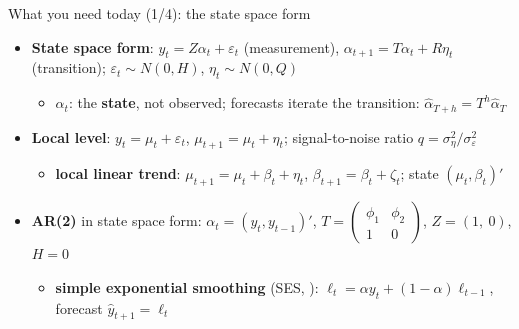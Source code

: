 \begin{frame}{What you need today (1/4): the state space form}
\itemsize{\small}
\begin{itemize}
    \item \textbf{State space form}: $y_t = Z\alpha_t + \varepsilon_t$ (measurement), $\alpha_{t+1} = T\alpha_t + R\eta_t$ (transition); $\varepsilon_t \sim N(0, H)$, $\eta_t \sim N(0, Q)$
    \begin{itemize}
        \item $\alpha_t$: the \textbf{state}, not observed; forecasts iterate the transition: $\hat\alpha_{T+h} = T^h\hat\alpha_T$
    \end{itemize}
    \item \textbf{Local level}: $y_t = \mu_t + \varepsilon_t$, $\mu_{t+1} = \mu_t + \eta_t$; signal-to-noise ratio $q = \sigma^2_\eta/\sigma^2_\varepsilon$
    \begin{itemize}
        \item \textbf{local linear trend}: $\mu_{t+1} = \mu_t + \beta_t + \eta_t$, $\beta_{t+1} = \beta_t + \zeta_t$; state $(\mu_t, \beta_t)'$
    \end{itemize}
    \item \textbf{AR(2)} in state space form: $\alpha_t = (y_t, y_{t-1})'$, $T = \begin{pmatrix}\phi_1 & \phi_2\\ 1 & 0\end{pmatrix}$, $Z = (1,\ 0)$, $H = 0$
    \begin{itemize}
        \item \textbf{simple exponential smoothing} (SES, ): $\ell_t = \alpha y_t + (1-\alpha)\ell_{t-1}$, forecast $\hat y_{t+1} = \ell_t$
    \end{itemize}
\end{itemize}
\end{frame}

